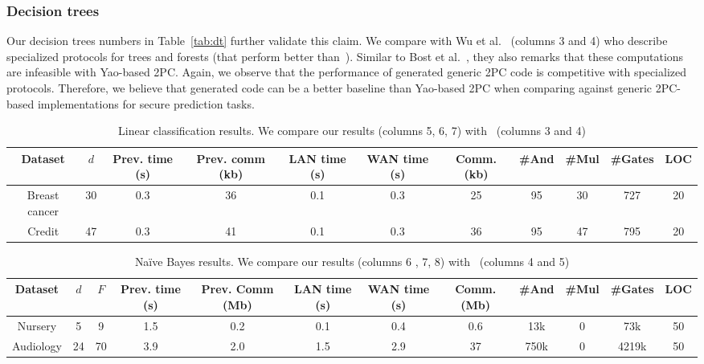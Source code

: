 \subsubsection*{Decision trees}
Our decision trees numbers in Table~\ref{tab:dt} further validate
this claim. We compare with Wu et al.~\cite{wu} (columns 3 and 4) who
describe specialized protocols for trees and forests (that perform
better than~\cite{shafindss}).
Similar to Bost et al.~\cite{shafindss}, they also remarks that these
computations are infeasible with Yao-based 2PC.
 Again, we observe that
the performance of \tool generated generic 2PC
code is competitive with specialized protocols. Therefore, we believe
that \tool generated code can be a better baseline than Yao-based 2PC
when comparing against generic 2PC-based implementations for secure
prediction tasks. 

\begin{table*}
\begin{tabular}{c|c|c|c|c |c|c|c|c|c|c}
Dataset & $d$  & Prev. time (s) & Prev. comm (kb) & LAN time (s) & WAN time (s) & Comm. (kb)  & \#And & \#Mul & \#Gates & LOC\\
\hline
Breast cancer & 30 & 0.3 & 36 & 0.1 & 0.3 & 25 & 95 & 30 & 727 & 20\\
\hline
Credit & 47 & 0.3 & 41 & 0.1 & 0.3 & 36 & 95 & 47 & 795 & 20\\
\hline
\end{tabular}

 \caption{Linear classification results. We compare our results (columns 5, 6, 7) with~\cite{shafindss} (columns 3 and 4)}
 \label{tab:lc} 
\end{table*}

\begin{table*}
\begin{tabular}{c|c|c|c|c|c |c|c|c|c|c|c}
Dataset & $d$ & $F$ & Prev. time (s) & Prev. Comm (Mb) & LAN time (s) & WAN time (s) & Comm. (Mb)  & \#And & \#Mul & \#Gates  & LOC\\
\hline
Nursery & 5 & 9 & 1.5 & 0.2 & 0.1 & 0.4 & 0.6 & 13k & 0 & 73k & 50\\
\hline
Audiology & 24 & 70 & 3.9 & 2.0 & 1.5 & 2.9 & 37 & 750k & 0 & 4219k & 50\\
\hline
\end{tabular}

 \caption{Na\"{i}ve Bayes results. We compare our results (columns 6 , 7, 8) with~\cite{shafindss} (columns 4 and 5)}
 \label{tab:nb} 
\end{table*}

